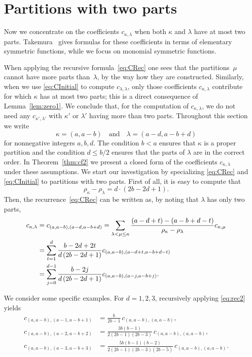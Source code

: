 \documentclass[smallextended]{svjour3}
\begin{document}
\section{Partitions with two parts}\label{sec:2parts}

Now we concentrate on the coefficients $c_{\kappa,\lambda}$ when both $\kappa$
and $\lambda$ have at most two parts. Takemura~\cite[\S~4.4]{Takemura}
gives formulas for these coefficients in terms of elementary symmetric
functions, while we focus on monomial symmetric functions.

When applying the recursive formula~\eqref{eq:CRec} one sees that the
partitions~$\mu$ cannot have more parts than~$\lambda$, by the way how they
are constructed. Similarly, when we use \eqref{eq:CInitial} to compute
$c_{\lambda,\lambda}$, only those coefficients $c_{\kappa,\lambda}$ contribute
for which $\kappa$ has at most two parts; this is a direct consequence of
Lemma~\ref{lem:zero1}.  We conclude that, for the computation of
$c_{\kappa,\lambda}$, we do not need any $c_{\kappa',\lambda'}$ with $\kappa'$
or $\lambda'$ having more than two parts.  Throughout this section we write
\[
  \kappa=(a,a-b) \quad\text{and}\quad \lambda=(a-d,a-b+d)
\]
for nonnegative integers $a,b,d$.  The condition $b<a$ ensures that $\kappa$
is a proper partition and the condition $d\leq b/2$ ensures that the
parts of $\lambda$ are in the correct order. In Theorem~\ref{thm:cf2} we
present a closed form of the coefficients $c_{\kappa,\lambda}$ under these
assumptions. We start our investigation by specializing
 \eqref{eq:CRec} and \eqref{eq:CInitial} to partitions with two
parts. First of all, it is easy to compute that 
\[
  \rho_{\kappa}-\rho_{\lambda} = d\cdot(2b-2d+1).
\]
Then, the recurrence~\eqref{eq:CRec} can be written as, by noting that
$\lambda$ has only two parts,
\begin{align}\label{eq:rec2}
  c_{\kappa,\lambda} &= c_{(a,a-b),(a-d,a-b+d)} =
  \sum_{\lambda<\mu\leq\kappa}\frac{(a-d+t)-(a-b+d-t)}{\rho_{\kappa}-\rho_{\lambda}} c_{\kappa,\mu} \\
  &= \sum_{t=1}^d\frac{b-2d+2t}{d\,(2b-2d+1)}c_{(a,a-b),(a-d+t,a-b+d-t)} \notag \\ 
  & = \sum_{j=0}^{d-1} \frac{b-2j}{d\,(2b-2d+1)}c_{(a,a-b),(a-j,a-b+j)}. \notag
\end{align}

\begin{example}\label{ex:twoparts}
We consider some specific examples.  For $d=1,2,3$, recursively applying \eqref{eq:rec2} yields
\allowdisplaybreaks
\begin{align*}
  c_{(a,a-b),(a-1,a-b+1)} &=
    \frac{b}{2b-1}\,c_{(a,a-b),(a,a-b)}, \\
  c_{(a,a-b),(a-2,a-b+2)} &=
\frac{3b(b-1)}{2(2b-1)(2b-3)}\,c_{(a,a-b),(a,a-b)}, \\
  c_{(a,a-b),(a-3,a-b+3)} &=
\frac{5b(b-1)(b-2)}{2(2b-1)(2b-3)(2b-5)}\,c_{(a,a-b),(a,a-b)}.
\end{align*}
\end{example}
\end{document}
